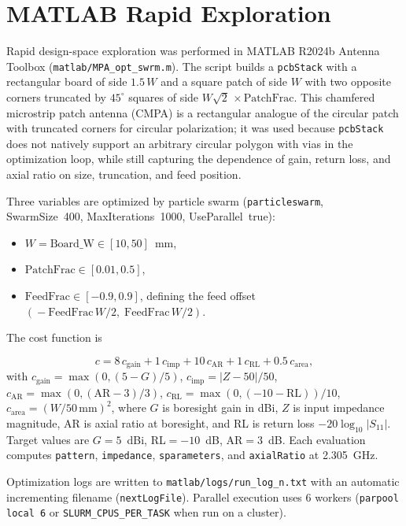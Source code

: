 \section{MATLAB Rapid Exploration}

Rapid design-space exploration was performed in MATLAB R2024b Antenna Toolbox (\texttt{matlab/MPA\_opt\_swrm.m}). The script builds a \texttt{pcbStack} with a rectangular board of side $1.5\,W$ and a square patch of side $W$ with two opposite corners truncated by $45^{\circ}$ squares of side $W\sqrt{2}\,\times\mathrm{PatchFrac}$. This chamfered microstrip patch antenna (CMPA) is a rectangular analogue of the circular patch with truncated corners for circular polarization; it was used because \texttt{pcbStack} does not natively support an arbitrary circular polygon with vias in the optimization loop, while still capturing the dependence of gain, return loss, and axial ratio on size, truncation, and feed position.

Three variables are optimized by particle swarm (\texttt{particleswarm}, SwarmSize~400, MaxIterations~1000, UseParallel~true):

\begin{itemize}[noitemsep]
    \item $W = \mathrm{Board\_W} \in [10, 50]$~mm,
    \item $\mathrm{PatchFrac} \in [0.01, 0.5]$,
    \item $\mathrm{FeedFrac} \in [-0.9, 0.9]$, defining the feed offset $(\!- \mathrm{FeedFrac}\,W/2,\; \mathrm{FeedFrac}\,W/2)$.
\end{itemize}

The cost function is

\begin{equation}
    c = 8\,c_{\mathrm{gain}} + 1\,c_{\mathrm{imp}} + 10\,c_{\mathrm{AR}} + 1\,c_{\mathrm{RL}} + 0.5\,c_{\mathrm{area}},
\end{equation}
with $c_{\mathrm{gain}}=\max(0,(5-G)/5)$, $c_{\mathrm{imp}}=|Z-50|/50$, $c_{\mathrm{AR}}=\max(0,(\mathrm{AR}-3)/3)$, $c_{\mathrm{RL}}=\max(0,(-10-\mathrm{RL}))/10$, $c_{\mathrm{area}}=(W/50\,\mathrm{mm})^{2}$, where $G$ is boresight gain in dBi, $Z$ is input impedance magnitude, AR is axial ratio at boresight, and RL is return loss $-20\log_{10}|S_{11}|$. Target values are $G=5$~dBi, RL${}=-10$~dB, AR${}=3$~dB. Each evaluation computes \texttt{pattern}, \texttt{impedance}, \texttt{sparameters}, and \texttt{axialRatio} at 2.305~GHz.

Optimization logs are written to \texttt{matlab/logs/run\_log\_n.txt} with an automatic incrementing filename (\texttt{nextLogFile}). Parallel execution uses 6 workers (\texttt{parpool local 6} or \texttt{SLURM\_CPUS\_PER\_TASK} when run on a cluster).

